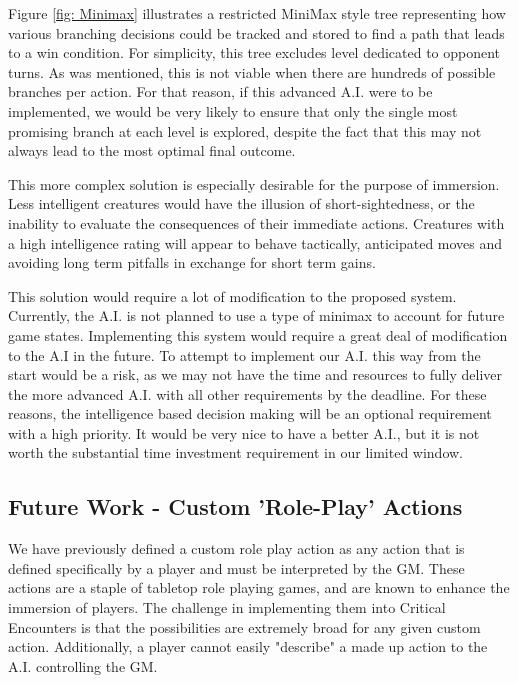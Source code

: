 \documentclass[12pt,a4paper]{report}
\begin{document}
		Figure \ref{fig: Minimax} illustrates a restricted MiniMax style tree representing how various branching decisions could be tracked and stored to find a path that leads to a win condition. For simplicity, this tree excludes level dedicated to opponent turns. As was mentioned, this is not viable when there are hundreds of possible branches per action. For that reason, if this advanced A.I. were to be implemented, we would be very likely to ensure that only the single most promising branch at each level is explored, despite the fact that this may not always lead to the most optimal final outcome. 
		
		This more complex solution is especially desirable for the purpose of immersion. Less intelligent creatures would have the illusion of short-sightedness, or the inability to evaluate the consequences of their immediate actions. Creatures with a high intelligence rating will appear to behave tactically, anticipated moves and avoiding long term pitfalls in exchange for short term gains. 
		
		This solution would require a lot of modification to the proposed system. Currently, the A.I. is not planned to use a type of minimax to account for future game states. Implementing this system would require a great deal of modification to the A.I in the future. To attempt to implement our A.I. this way from the start would be a risk, as we may not have the time and resources to fully deliver the more advanced A.I. with all other requirements by the deadline. For these reasons, the intelligence based decision making will be an optional requirement with a high priority. It would be very nice to have a better A.I., but it is not worth the substantial time investment requirement in our limited window. 
		
		
		\subsection{Future Work - Custom 'Role-Play' Actions}
		
		We have previously defined a custom role play action as any action that is defined specifically by a player and must be interpreted by the GM. These actions are a staple of tabletop role playing games, and are known to enhance the immersion of players. The challenge in implementing them into Critical Encounters is that the possibilities are extremely broad for any given custom action. Additionally, a player cannot easily "describe" a made up action to the A.I. controlling the GM. 
		
\end{document}
